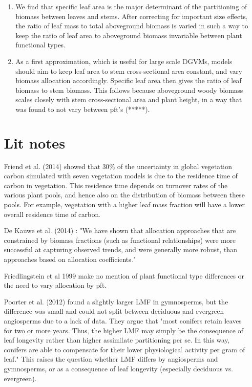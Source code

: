 \documentclass[a4paper]{article}
\begin{document}
\begin{enumerate}
  \item We find that specific leaf area is the major determinant of the partitioning of biomass between leaves and stems. After correcting for important size effects, the ratio of leaf mass to total aboveground biomass is varied in such a way to keep the ratio of leaf area to aboveground biomass invariable between plant functional types.
  \item As a first approximation, which is useful for large scale DGVMs, models should aim to keep leaf area to stem cross-sectional area constant, and vary biomass allocation accordingly. Specific leaf area then gives the ratio of leaf biomass to stem biomass. This follows because aboveground woody biomass scales closely with stem cross-sectional area and plant height, in a way that was found to not vary between pft's (*****). 


\end{enumerate}






\section{Lit notes}

Friend et al. (2014) showed that 30\% of the uncertainty in global vegetation carbon simulated with seven vegetation models is due to the residence time of carbon in vegetation. This residence time depends on turnover rates of the various plant pools, and hence also on the distribution of biomass between these pools. For example, vegetation with a higher leaf mass fraction will have a lower overall residence time of carbon.

De Kauwe et al. (2014) : "We have shown that allocation approaches that are constrained by biomass fractions (such as functional relationships) were more successful at capturing observed trends, and were generally more robust, than approaches based on allocation coefficients."

Friedlingstein et al 1999 make no mention of plant functional type differences or the need to vary allocation by pft.

Poorter et al. (2012) found a slightly larger LMF in gymnosperms, but the difference was small and could not split between deciduous and evergreen angiosperms due to a lack of data. They argue that "most conifers retain leaves for two or more years. Thus, the higher LMF may simply be the consequence of leaf longevity rather than higher assimilate partitioning per se. In this way, conifers are able to compensate for their lower physiological activity per gram of leaf." This raises the question whether LMF differs by angiosperms and gymnosperms, or as a consequence of leaf longevity (especially deciduous vs. evergreen).
\end{document}
